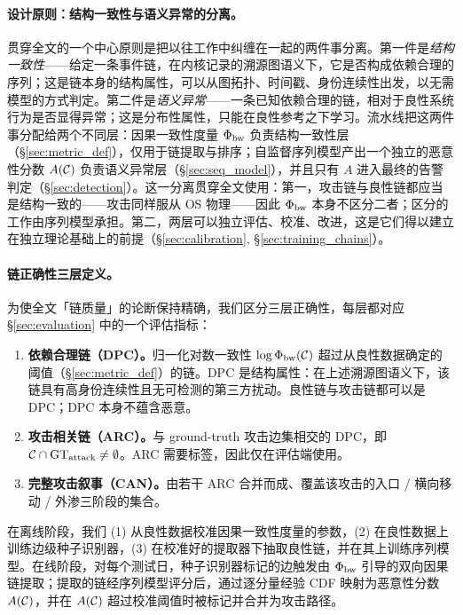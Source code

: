 \paragraph{设计原则：结构一致性与语义异常的分离。}贯穿全文的一个中心原则是把以往工作中纠缠在一起的两件事分离。第一件是\emph{结构一致性}——给定一条事件链，在内核记录的溯源图语义下，它是否构成依赖合理的序列；这是链本身的结构属性，可以从图拓扑、时间戳、身份连续性出发，以无需模型的方式判定。第二件是\emph{语义异常}——一条已知依赖合理的链，相对于良性系统行为是否显得异常；这是分布性属性，只能在良性参考之下学习。流水线把这两件事分配给两个不同层：因果一致性度量 $\Phi_{\text{bw}}$ 负责结构一致性层（\S\ref{sec:metric_def}），仅用于链提取与排序；自监督序列模型产出一个独立的恶意性分数 $A(\mathcal{C})$ 负责语义异常层（\S\ref{sec:seq_model}），并且只有 $A$ 进入最终的告警判定（\S\ref{sec:detection}）。这一分离贯穿全文使用：第一，攻击链与良性链都应当是结构一致的——攻击同样服从 OS 物理——因此 $\Phi_{\text{bw}}$ 本身不区分二者；区分的工作由序列模型承担。第二，两层可以独立评估、校准、改进，这是它们得以建立在独立理论基础上的前提（\S\ref{sec:calibration}, \S\ref{sec:training_chains}）。

\paragraph{链正确性三层定义。}为使全文「链质量」的论断保持精确，我们区分三层正确性，每层都对应 \S\ref{sec:evaluation} 中的一个评估指标：

\begin{enumerate}
\item \textbf{依赖合理链（DPC）。}归一化对数一致性 $\log \Phi_{\text{bw}}(\mathcal{C})$ 超过从良性数据确定的阈值（\S\ref{sec:metric_def}）的链。DPC 是结构属性：在上述溯源图语义下，该链具有高身份连续性且无可检测的第三方扰动。良性链与攻击链都可以是 DPC；DPC 本身不蕴含恶意。
\item \textbf{攻击相关链（ARC）。}与 ground-truth 攻击边集相交的 DPC，即 $\mathcal{C} \cap \mathrm{GT}_{\text{attack}} \neq \emptyset$。ARC 需要标签，因此仅在评估端使用。
\item \textbf{完整攻击叙事（CAN）。}由若干 ARC 合并而成、覆盖该攻击的入口 / 横向移动 / 外渗三阶段的集合。
\end{enumerate}

在离线阶段，我们 (1) 从良性数据校准因果一致性度量的参数，(2) 在良性数据上训练边级种子识别器，(3) 在校准好的提取器下抽取良性链，并在其上训练序列模型。在线阶段，对每个测试日，种子识别器标记的边触发由 $\Phi_{\text{bw}}$ 引导的双向因果链提取；提取的链经序列模型评分后，通过逐分量经验 CDF 映射为恶意性分数 $A(\mathcal{C})$，并在 $A(\mathcal{C})$ 超过校准阈值时被标记并合并为攻击路径。

